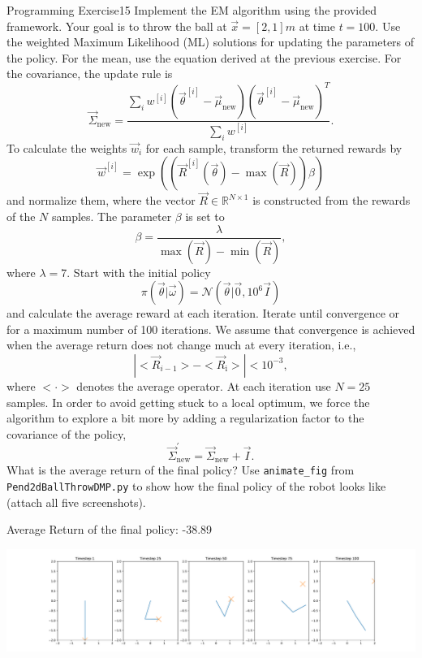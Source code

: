 \begin{questions}
\begin{question}{Programming Exercise}{15}
Implement the EM algorithm using the provided framework. Your goal is to throw the ball at $\vec x = [2,1]m$ at time $t=100$. Use the weighted Maximum Likelihood (ML) solutions for updating the parameters of the policy. For the mean, use the equation derived at the previous exercise. For the covariance, the update rule is 
\begin{equation}
	\vec \Sigma_\mathrm{new} = \frac{\sum_i w^{[i]} (\vec{\theta}^{[i]}-\vec{\mu}_{\mathrm{new}})     (\vec{\theta}^{[i]}-\vec{\mu}_{\mathrm{new}})^T}{\sum_i w^{[i]}}.
\end{equation}
To calculate the weights $\vec{w}_i$ for each sample, transform the returned rewards by 
\begin{equation}
	\vec w^{[i]} = \exp ( ( \vec{R}^{[i]}(\vec{\theta}) - \max(\vec{R}) ) \beta )
\end{equation}
and normalize them, where the vector $\vec R\in \mathbb{R}^{N \times 1}$ is constructed from the rewards of the $N$ samples. The
parameter $\beta$ is set to
\begin{equation}
	\beta = \frac{\lambda}{ \max(\vec{R}) - \min(\vec{R}) },
\end{equation}
where $\lambda = 7$. Start with the initial policy 
\begin{equation}
	\pi(\vec{\theta}|\vec{\omega}) = \mathcal{N}(\vec{\theta}|\vec{0}, 10^6  \vec{I})
\end{equation}
and calculate the average reward at each iteration. Iterate until convergence or for a maximum number of 100 iterations.
We assume that convergence is achieved when the average return does not change much at every iteration, i.e., 
$$ | <\vec{R}_{i-1}> - <\vec{R}_\textrm{i}> | < 10^{-3}, $$
where $<\cdot>$ denotes the average operator.
At each iteration use 
$ N = 25 $ samples. In order to avoid getting stuck to a local optimum, we force the algorithm to explore a bit more by adding a regularization factor to the covariance of the policy,
\begin{equation}
    \vec{\Sigma}_\mathrm{new}^\mathrm{'} = \vec{\Sigma}_\mathrm{new} + \vec{I}.
\end{equation}
What is the average return of the final policy? 
Use \texttt{animate\_fig} from \texttt{Pend2dBallThrowDMP.py} to show how the final policy of the robot looks like (attach all five screenshots).

\begin{answer}
Average Return of the final policy: -38.89
\begin{center}
	\includegraphics[width=1\textwidth]{img/EM-b.pdf}
\end{center}
\end{answer}


\end{question}
\end{questions}

